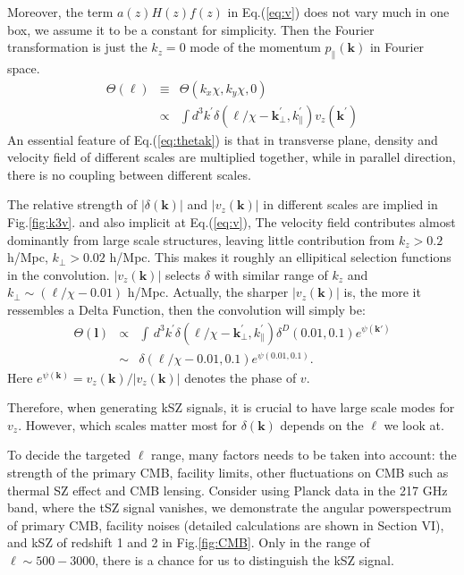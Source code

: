 Moreover, the term $a(z)H(z)f(z)$ in Eq.(\ref{eq:v}) does not vary much in one box, we assume it to be a constant for simplicity. 
Then the Fourier transformation is just the $k_z=0$ mode of the momentum 
$p_\parallel(\bm{k})$ in Fourier space. 
\begin{eqnarray}
    \label{eq:thetak}
    \Theta(\bm{\ell})&\equiv&\Theta({k}_x\chi,{k}_y\chi,0)\\
    &\propto&\int 
    d^3k^\prime\delta(\bm{\ell}/\chi-\bm{k}_\perp^\prime,k_\parallel^\prime) v_z(\bm{k^\prime})\nonumber
    \end{eqnarray}
An essential feature of Eq.(\ref{eq:thetak}) is that
in transverse plane, density and velocity field of different scales are multiplied together, 
 while in parallel direction, 
 there is no coupling between different scales.  

The relative strength of $|\delta(\bm{k})|$ and $|v_z(\bm{k})|$ in different scales 
are implied in Fig.\ref{fig:k3v}. 
and also implicit at Eq.(\ref{eq:v}), 
The velocity field contributes almost dominantly from large scale structures, 
leaving little contribution from $k_z>0.2$ h/Mpc, $k_\perp> 0.02$ h/Mpc. 
This makes it roughly an ellipitical selection functions in the convolution. 
$|v_z(\bm{k})|$ selects $\delta$ with similar range of $k_z$ and $k_\perp\sim(\ell/\chi-0.01)$ h/Mpc.  
Actually, the sharper $|v_z(\bm{k})|$ is, 
the more it ressembles a Delta Function, 
then the convolution will simply be:
\begin{eqnarray}
    \Theta(\bm{l}) &\propto& \int\, 
    d^3k^\prime\delta(\bm{\ell}/\chi-\bm{k}_\perp^\prime,k_\parallel^\prime) 
    \delta^D(0.01,0.1)e^{\psi(\bm{k\prime})} \\
    &\sim& \delta(\ell/\chi-0.01,0.1)e^{\psi(0.01,0.1)}.
\end{eqnarray}
Here $e^{\psi(\bm{k})}=v_z(\bm{k})/|v_z(\bm{k})|$ denotes the phase of $v$.

Therefore, when generating kSZ signals, 
it is crucial to have large scale modes for $v_z$. 
However, which scales matter most for $\delta(\bm{k})$ 
depends on the $\ell$ we look at.  

To decide the targeted $\ell$ range, 
many factors needs to be taken into account:  
the strength of the primary CMB, facility limits, 
other fluctuations on CMB such as thermal SZ effect and CMB lensing.
Consider using Planck \cite{Planck2015} data 
in the 217 GHz band, where the tSZ signal vanishes, 
we demonstrate the angular powerspectrum of primary CMB, 
facility noises (detailed calculations are shown in Section VI), 
and kSZ of redshift 1 and 2 
in Fig.\ref{fig:CMB}. 
Only in the range of $\ell \sim 500-3000$, 
there is a chance for us to distinguish the kSZ signal.  

